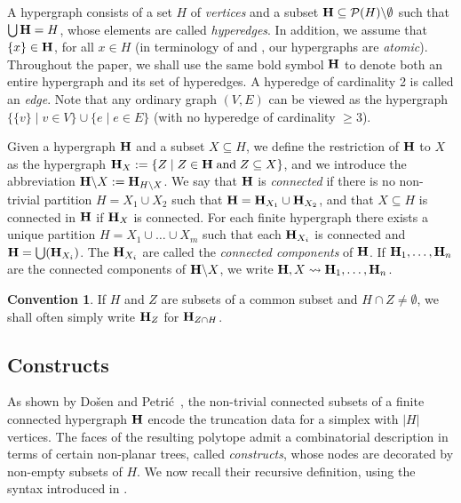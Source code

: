 \documentclass{article}
\theoremstyle{plain}
\theoremstyle{definition}
\newtheorem{convention}[thm]{Convention}
\newcommand{\inc}{\subseteq}
\newcommand{\union}{\cup}
\newcommand{\Union}{\bigcup}
\newcommand{\set}[1]{\{#1\}}
\newcommand{\setc}[2]{\set{#1 \mid #2}}
\newcommand{\hyper}[1]{{\bf #1}}
\newcommand{\restrH}[2]{\hyper{#1}\backslash #2}
\begin{document}
A hypergraph   consists of a  set  $H$ of {\em vertices}  and a subset 
$\hyper{H}\inc {\mathcal{P}}(H)\backslash\emptyset$ such that $\Union \hyper{H}=H$, whose elements are called  \emph{hyperedges}.  In addition, we   assume that 
 $\set{x}\in \hyper{H}$, for all $x\in H$ (in terminology of \cite{DP} and \cite{PLBJ1}, our hypergraphs are {\it{atomic}}). Throughout the paper, we shall use the same bold symbol $\hyper{H}$ to denote both an  entire hypergraph  and its set  of hyperedges. A hyperedge of cardinality 2 is called an \emph{edge}.  Note that any ordinary graph $(V,E)$ can be viewed as the hypergraph
$\setc{\set{v}}{v\in V} \union \setc{e}{e\in E}$ (with no hyperedge  of cardinality $\geq 3$). 


\smallskip
 
Given a hypergraph $\hyper{H}$    and  a subset $X\inc H$, we define the restriction of $\hyper{H}$ to $X$ as the hypergraph
$\hyper{H}_X:=\setc{Z}{Z\in \hyper{H}\;\mbox{and}\; Z\inc X}$, and we introduce the abbreviation $\restrH{H}{X}:=\hyper{H}_{H\backslash X}$. We say that $\hyper{H}$ is \emph{connected} if there is no non-trivial partition $H=X_1\union X_2$ such that $\hyper{H}=\hyper{H}_{X_1}\union \hyper{H}_{X_2}$, and that $X\inc H$ is connected in $\hyper{H}$
if $\hyper{H}_X$ is connected.
For each finite hypergraph there exists a unique partition
$H=X_1\union\ldots\union X_m$ such that each $\hyper{H}_{X_i}$ is connected and $\hyper{H}=\Union(\hyper{H}_{X_i})$.  The $\hyper{H}_{X_i}$ are called  the \emph{connected components} of $\hyper{H}$. If $\hyper{H}_1,\ldots,\hyper{H}_n$ are  the
 connected components of $\restrH{H}{X}$, we write
$\hyper{H},X  \leadsto \hyper{H}_1,\ldots, \hyper{H}_n$.
 
 \begin{convention} \label{restriction-convention}
 If $H$ and $Z$ are subsets of a common subset and $H\cap Z\neq\emptyset$, we shall often simply write
 $\hyper{H}_Z$ for $\hyper{H}_{Z\cap H}$.
 \end{convention}
 
 
 

\subsection{Constructs} \label{constructs-subsection}
As shown by  Do\v sen and Petri\'c~\cite{DP},  the non-trivial connected subsets of a finite connected hypergraph ${\bf H}$ 
encode the truncation data for a simplex with  $|H|$ vertices. 
The faces of the resulting polytope  admit a combinatorial description in terms of certain
non-planar trees, called \emph{constructs}, whose nodes are decorated by non-empty subsets of $H$. We now recall their recursive definition, using the syntax introduced in \cite{COI}.
\end{document}
